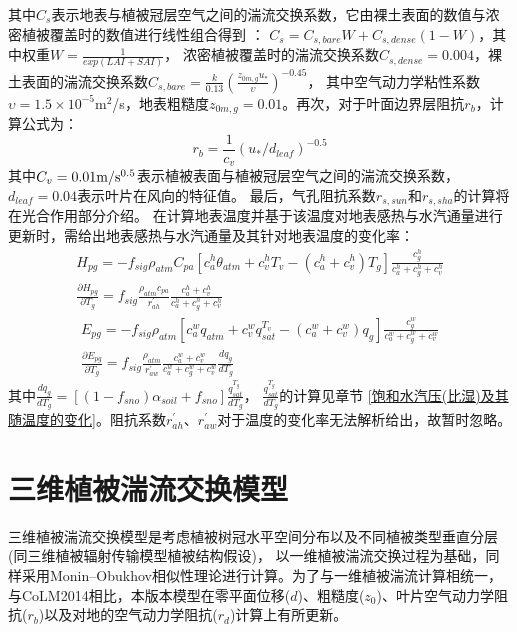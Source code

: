 其中$C_s$表示地表与植被冠层空气之间的湍流交换系数，它由裸土表面的数值与浓密植被覆盖时的数值进行线性组合得到 \citep{zeng2005vegetation}：
$C_s=C_{s,bare}W+C_{s,dense}\left(1-W\right)$，其中权重$W=\frac{1}{exp{\left(LAI+SAI\right)}}$，
浓密植被覆盖时的湍流交换系数$C_{s,dense}=0.004$，裸土表面的湍流交换系数$C_{s,bare}=\frac{k}{0.13}\left(\frac{z_{0m,g}u_\ast}{\upsilon}\right)^{-0.45}$，
其中空气动力学粘性系数$\upsilon=1.5\times{10}^{-5}$m$^2$/s，地表粗糙度$z_{0m,g}=0.01$。再次，对于叶面边界层阻抗$r_b$，计算公式为：
\begin{equation}
r_{b}=\frac{1}{c_{v}}\left(u_{*} / d_{{leaf }}\right)^{-0.5}
\end{equation}
其中$C_v=0.01\rm m/s^{0.5}$表示植被表面与植被冠层空气之间的湍流交换系数，$d_{leaf}=0.04$表示叶片在风向的特征值。
最后，气孔阻抗系数$r_{s,sun}$和$r_{s,sha}$的计算将在光合作用部分介绍。
在计算地表温度并基于该温度对地表感热与水汽通量进行更新时，需给出地表感热与水汽通量及其针对地表温度的变化率：
\begin{equation}
\begin{array}{c}H_{p g}=-f_{{sig }} \rho_{atm} C_{p a}\left[c_{a}^{h} \theta_{atm}+c_{v}^{h} T_{v}-\left(c_{a}^{h}+c_{v}^{h}\right) 
     T_{g}\right] \frac{c_{g}^{h}}{c_{a}^{h}+c_{g}^{h}+c_{v}^{h}} \\ 
     \frac{\partial H_{p g}}{\partial T_{g}}=f_{sig} \frac{\rho_{atm} c_{p a}}{r_{a h}^{\prime}} 
     \frac{c_{a}^{h}+c_{v}^{h}}{c_{a}^{h}+c_{g}^{h}+c_{v}^{h}}\end{array}
\end{equation}
\begin{equation}
\begin{array}{c}E_{p g}=-f_{sig} \rho_{atm}\left[c_{a}^{w} q_{atm}+c_{v}^{w} q_{s a t}^{T_{v}}-\left(c_{a}^{w}+c_{v}^{w}\right)
      q_{g}\right] \frac{c_{g}^{w}}{c_{a}^{w}+c_{g}^{w}+c_{v}^{w}} \\ \frac{\partial E_{p g}}{\partial T_{g}}=f_{sig}
      \frac{\rho_{atm}}{r_{a w}^{\prime}} \frac{c_{a}^{w}+c_{v}^{w}}{c_{a}^{w}+c_{g}^{w}+c_{v}^{w}} \frac{d q_{g}}{d T_{g}}\end{array}
\end{equation}
其中$\frac{dq_g}{dT_g}=\left[\left(1-f_{sno}\right)\alpha_{soil}+f_{sno}\right]\frac{q_{sat}^{T_g}}{dT_g}$，
$\frac{q_{sat}^{T_g}}{dT_g}$的计算见章节 \ref{饱和水汽压(比湿)及其随温度的变化}。阻抗系数$r_{ah}^\prime$、$r_{aw}^\prime$对于温度的变化率无法解析给出，故暂时忽略。




\section{三维植被湍流交换模型}
三维植被湍流交换模型是考虑植被树冠水平空间分布以及不同植被类型垂直分层(同三维植被辐射传输模型植被结构假设)，
以一维植被湍流交换过程为基础，同样采用Monin–Obukhov相似性理论进行计算。为了与一维植被湍流计算相统一，
与CoLM2014相比，本版本模型在零平面位移($d$)、粗糙度($z_0$)、叶片空气动力学阻抗($r_b$)以及对地的空气动力学阻抗($r_d$)计算上有所更新。

